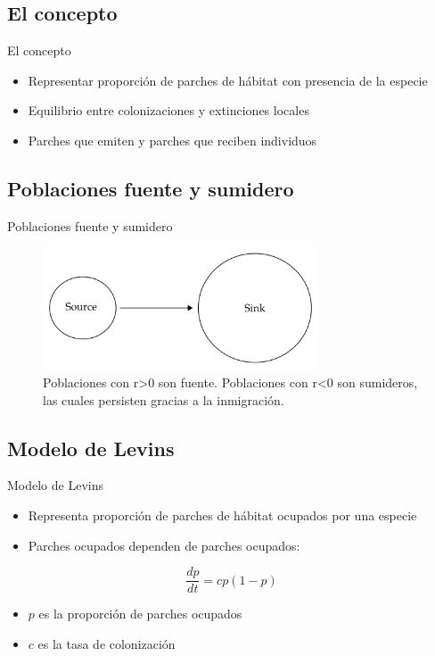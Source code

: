 \documentclass[
  11pt,
  ignorenonframetext,
]{beamer}
\begin{document}
\hypertarget{el-concepto-1}{%
\subsection{El concepto}\label{el-concepto-1}}

\begin{frame}{El concepto}
\begin{itemize}
\item
  Representar proporción de parches de hábitat con presencia de la
  especie
\item
  Equilibrio entre colonizaciones y extinciones locales
\item
  Parches que emiten y parches que reciben individuos
\end{itemize}
\end{frame}

\hypertarget{poblaciones-fuente-y-sumidero}{%
\subsection{Poblaciones fuente y
sumidero}\label{poblaciones-fuente-y-sumidero}}

\begin{frame}{Poblaciones fuente y sumidero}
\begin{figure}

{\centering \includegraphics[width=3.21in]{Metapoblaciones/Fuente-sumidero} 

}

\caption{Poblaciones con r>0 son fuente. Poblaciones con r<0 son sumideros, las cuales persisten gracias a la inmigración.}\label{fig:unnamed-chunk-5}
\end{figure}
\end{frame}

\hypertarget{modelo-de-levins}{%
\subsection{Modelo de Levins}\label{modelo-de-levins}}

\begin{frame}{Modelo de Levins}
\begin{itemize}
\item
  Representa proporción de parches de hábitat ocupados por una especie
\item
  Parches ocupados dependen de parches ocupados:
\end{itemize}

\[\frac{dp}{dt} = cp(1-p)\]

\begin{itemize}
\item
  \(p\) es la proporción de parches ocupados
\item
  \(c\) es la tasa de colonización
\end{itemize}
\end{frame}
\end{document}
